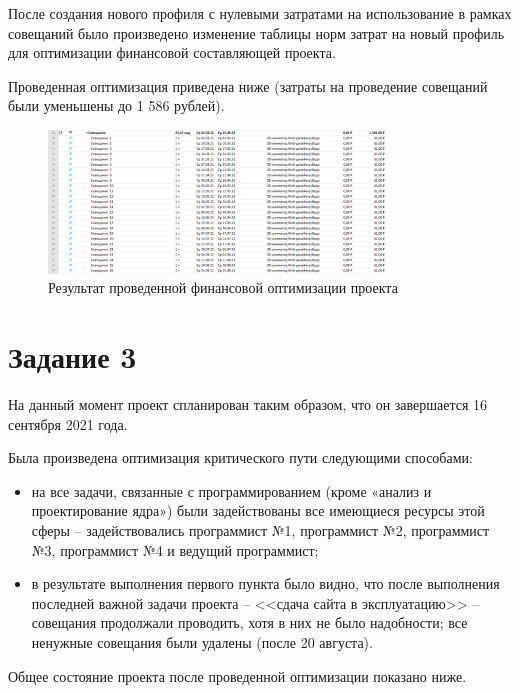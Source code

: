 После создания нового профиля с нулевыми затратами на использование в рамках совещаний было произведено изменение таблицы норм затрат на новый профиль для оптимизации финансовой составляющей проекта.

Проведенная оптимизация приведена ниже (затраты на проведение совещаний были уменьшены до 1 586 рублей).

\begin{figure}[H]
    \centering
    \includegraphics[width=0.8\textwidth]{img/content/task_2_meetings.png}
    \caption{Результат проведенной финансовой оптимизации проекта}
    \label{fig:task_2_meetings}
\end{figure}

\section{Задание 3}

На данный момент проект спланирован таким образом, что он завершается 16 сентября 2021 года.

Была произведена оптимизация критического пути следующими способами:

\begin{itemize}
    \item на все задачи, связанные с программированием (кроме «анализ и проектирование ядра») были задействованы все имеющиеся ресурсы этой сферы – задействовались программист №1, программист №2, программист №3, программист №4 и ведущий программист;
    \item в результате выполнения первого пункта было видно, что после выполнения последней важной задачи проекта – <<сдача сайта в эксплуатацию>> – совещания продолжали проводить, хотя в них не было надобности; все ненужные совещания были удалены (после 20 августа).
\end{itemize}

Общее состояние проекта после проведенной оптимизации показано ниже.

